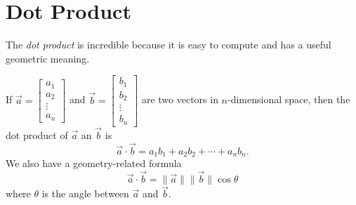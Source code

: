 \documentclass{article}
\begin{document}
\section*{Dot Product}
	The \emph{dot product} is incredible because it is easy to compute and has a useful
	geometric meaning.

	If $\vec a=\begin{bmatrix}a_1\\ a_2\\ \vdots \\ a_n\end{bmatrix}$ and 
	$\vec b=\begin{bmatrix}b_1\\ b_2\\ \vdots \\ b_n\end{bmatrix}$ are two vectors in $n$-dimensional
	space, then the dot product of $\vec a$ an $\vec b$ is
	\[
		\vec a\cdot\vec b = a_1b_1+a_2b_2+\cdots+a_nb_n.
	\]
	We also have a geometry-related formula
	\[
		\vec a\cdot \vec b = \|\vec a\|\|\vec b\|\cos \theta
	\]
	where $\theta$ is the angle between $\vec a$ and $\vec b$.
	
\end{document}
